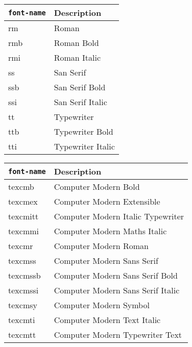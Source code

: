 \samepage 
{\small
\begin{tabular}{ll} \hline
{\tt font-name} & Description \\ \hline
rm              & Roman \\
rmb             & Roman Bold \\
rmi             & Roman Italic \\
ss              & San Serif \\
ssb             & San Serif Bold \\
ssi             & San Serif Italic \\
tt              & Typewriter \\ 
ttb             & Typewriter Bold \\ 
tti             & Typewriter Italic \\ \hline
\end{tabular}  %

\begin{tabular}{ll} \hline
{\tt font-name} & Description \\ \hline
texcmb		& Computer Modern Bold		\\
texcmex		& Computer Modern Extensible		\\
texcmitt	& Computer Modern Italic Typewriter  		\\
texcmmi 	& Computer Modern Maths Italic		\\
texcmr		& Computer Modern Roman		\\
texcmss 	& Computer Modern Sans Serif		\\
texcmssb	& Computer Modern Sans Serif Bold		\\
texcmssi	& Computer Modern Sans Serif Italic		\\
texcmsy		& Computer Modern Symbol		\\
texcmti		& Computer Modern Text Italic 		\\
texcmtt		& Computer Modern Typewriter Text 		\\
\hline
\end{tabular}

}
